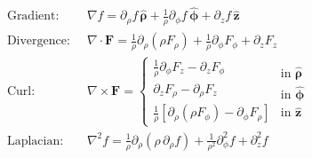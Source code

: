 \begin{align*}
\text{Gradient:}   \;\; &\nabla f = \partial_\rho f\,\bm{\hat{\rho}} 
                                 + \frac{1}{\rho}\partial_\phi f\,\bm{\hat{\phi}} 
                                 + \partial_z f\,\hat{\mathbf{z}} \\
\text{Divergence:} \;\; &\nabla \cdot \mathbf{F} = \frac{1}{\rho}\partial_\rho (\rho F_\rho) 
                                 + \frac{1}{\rho}\partial_\phi F_\phi 
                                 + \partial_z F_z \\
\text{Curl:}       \;\; &\nabla \times \mathbf{F} = \begin{cases}
                                  \frac{1}{\rho}\partial_\phi F_z - \partial_z F_\phi \\[3pt]
                                  \partial_z F_\rho - \partial_\rho F_z \\[3pt]
                                  \frac{1}{\rho}\left[\partial_\rho (\rho F_\phi) - \partial_\phi F_\rho\right]
                                  \end{cases}
                                  \begin{matrix}
                                  \text{in } \bm{\hat{\rho}} \\[3pt]
                                  \text{in } \bm{\hat{\phi}} \\[3pt]
                                  \text{in } \hat{\mathbf{z}}
                                  \end{matrix} \\
\text{Laplacian:}  \;\; &\nabla^2 f = \frac{1}{\rho}\partial_\rho \left(\rho\,\partial_\rho f\right) 
                                 + \frac{1}{\rho^2}\partial^2_\phi f 
                                 + \partial^2_z f
\end{align*}